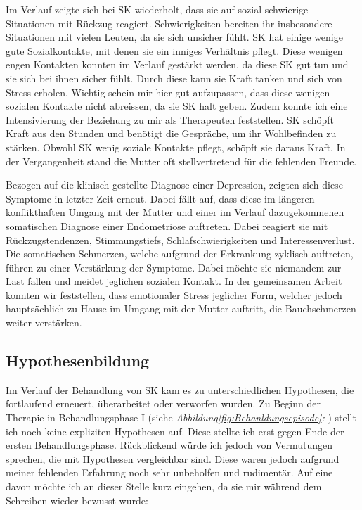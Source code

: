  Im Verlauf zeigte sich bei SK wiederholt, dass sie auf sozial schwierige Situationen mit Rückzug reagiert. Schwierigkeiten bereiten ihr insbesondere Situationen mit vielen Leuten, da sie sich unsicher fühlt. SK hat einige wenige gute Sozialkontakte, mit denen sie ein inniges Verhältnis pflegt. Diese wenigen engen Kontakten konnten im Verlauf gestärkt werden, da diese SK gut tun und sie sich bei ihnen sicher fühlt. Durch diese kann sie Kraft tanken und sich von Stress erholen. Wichtig schein mir hier gut aufzupassen, dass diese wenigen sozialen Kontakte nicht abreissen, da sie SK halt geben. Zudem konnte ich eine Intensivierung der Beziehung zu mir als Therapeuten feststellen. SK schöpft Kraft aus den Stunden und benötigt die Gespräche, um ihr Wohlbefinden zu stärken. Obwohl SK wenig soziale Kontakte pflegt, schöpft sie daraus Kraft. In der Vergangenheit stand die Mutter oft stellvertretend für die fehlenden Freunde. 
 
 Bezogen auf die klinisch gestellte Diagnose einer Depression, zeigten sich diese Symptome in letzter Zeit erneut. Dabei fällt auf, dass diese im längeren konflikthaften Umgang mit der Mutter und einer im Verlauf dazugekommenen somatischen Diagnose einer Endometriose auftreten. Dabei reagiert sie mit Rückzugstendenzen, Stimmungstiefs, Schlafschwierigkeiten und Interessenverlust. Die somatischen Schmerzen, welche aufgrund der Erkrankung zyklisch auftreten, führen zu einer Verstärkung der Symptome. Dabei möchte sie niemandem zur Last fallen und meidet jeglichen sozialen Kontakt. In der gemeinsamen Arbeit konnten wir feststellen, dass emotionaler Stress jeglicher Form, welcher jedoch hauptsächlich zu Hause im Umgang mit der Mutter auftritt, die Bauchschmerzen weiter verstärken.
 
\subsection{Hypothesenbildung} 
Im Verlauf der Behandlung von SK kam es zu unterschiedlichen Hypothesen, die fortlaufend erneuert, überarbeitet oder verworfen wurden. Zu Beginn der Therapie in Behandlungsphase I (siehe \textit{Abbildung\ref{fig:Behanldungsepisode}: }) stellt ich noch keine expliziten Hypothesen auf. Diese stellte ich erst gegen Ende der ersten Behandlungsphase. Rückblickend würde ich jedoch von Vermutungen sprechen, die  mit Hypothesen vergleichbar sind. Diese waren jedoch aufgrund meiner fehlenden Erfahrung noch sehr unbeholfen und rudimentär. Auf eine davon möchte ich an dieser Stelle kurz eingehen, da sie mir während dem Schreiben wieder bewusst wurde: 

